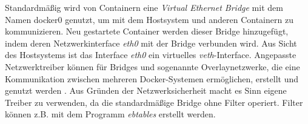 \documentclass[../main.tex]{subfiles}
\begin{document}
			Standardmäßig wird von Containern eine \emph{Virtual Ethernet Bridge} mit dem Namen docker0 genutzt, um mit dem Hostsystem und anderen Containern zu kommunizieren. Neu gestartete Container werden dieser Bridge hinzugefügt, indem deren Netzwerkinterface \emph{eth0} mit der Bridge verbunden wird. Aus Sicht des Hostsystems ist das Interface \emph{eth0} ein virtuelles \emph{veth}-Interface. Angepasste Netzwerktreiber können für Bridges und sogenannte Overlaynetzwerke, die eine Kommunikation zwischen mehreren Docker-Systemen ermöglichen, erstellt und genutzt werden \cite[S.3]{virtVSContainer}\cite{dockerNetworking}. Aus Gründen der Netzwerksicherheit macht es Sinn eigene Treiber zu verwenden, da die standardmäßige Bridge ohne Filter operiert. Filter können z.B. mit dem Programm \emph{ebtables} erstellt werden.




\end{document}
